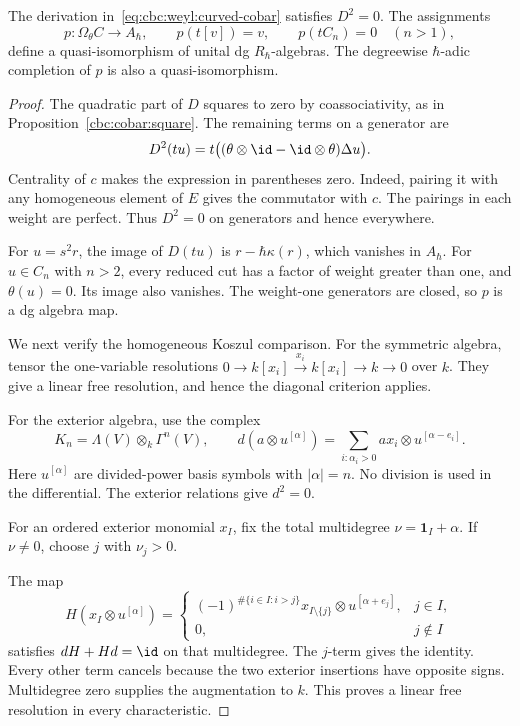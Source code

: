 \begin{theorem}\label{cbc:weyl:cobar}
The derivation in~\eqref{eq:cbc:weyl:curved-cobar} satisfies $D^2=0$.
The assignments
\[
 p:\Omega_\theta C\longrightarrow A_\hbar,
 \qquad p(t[v])=v,\qquad p(tC_n)=0\quad(n>1),
\]
define a quasi-isomorphism of unital dg $R_\hbar$-algebras.
The degreewise $\hbar$-adic completion of $p$ is also a quasi-isomorphism.
\end{theorem}
\begin{proof}
The quadratic part of $D$ squares to zero by coassociativity, as in Proposition~\ref{cbc:cobar:square}.
The remaining terms on a generator are
\[
 D^2(tu)=t\bigl((\theta\otimes\id-\id\otimes\theta)\Delta u\bigr).
\]
Centrality of $c$ makes the expression in parentheses zero.
Indeed, pairing it with any homogeneous element of $E$ gives the commutator with $c$.
The pairings in each weight are perfect.
Thus $D^2=0$ on generators and hence everywhere.

For $u=s^2r$, the image of $D(tu)$ is $r-\hbar\kappa(r)$, which vanishes in $A_\hbar$.
For $u\in C_n$ with $n>2$, every reduced cut has a factor of weight greater than one, and $\theta(u)=0$.
Its image also vanishes.
The weight-one generators are closed, so $p$ is a dg algebra map.

We next verify the homogeneous Koszul comparison.
For the symmetric algebra, tensor the one-variable resolutions
$0\to k[x_i]\xrightarrow{x_i}k[x_i]\to k\to0$ over $k$.
They give a linear free resolution, and hence the diagonal criterion applies.

For the exterior algebra, use the complex
\[
 K_n=\Lambda(V)\otimes_k\Gamma^n(V),\qquad
 d(a\otimes u^{[\alpha]})=
       \sum_{i:\alpha_i>0}a x_i\otimes u^{[\alpha-e_i]}.
\]
Here $u^{[\alpha]}$ are divided-power basis symbols with $|\alpha|=n$.
No division is used in the differential.
The exterior relations give $d^2=0$.

For an ordered exterior monomial $x_I$, fix the total multidegree
$\nu=\mathbf1_I+\alpha$.
If $\nu\ne0$, choose $j$ with $\nu_j>0$.

The map
\[
 H(x_I\otimes u^{[\alpha]})=
 \begin{cases}
 (-1)^{\#\{i\in I:i>j\}}x_{I\setminus\{j\}}
           \otimes u^{[\alpha+e_j]},&j\in I,\\
 0,&j\notin I
 \end{cases}
\]
satisfies $dH+Hd=\id$ on that multidegree.
The $j$-term gives the identity.
Every other term cancels because the two exterior insertions have opposite signs.
Multidegree zero supplies the augmentation to $k$.
This proves a linear free resolution in every characteristic.


\end{proof}
